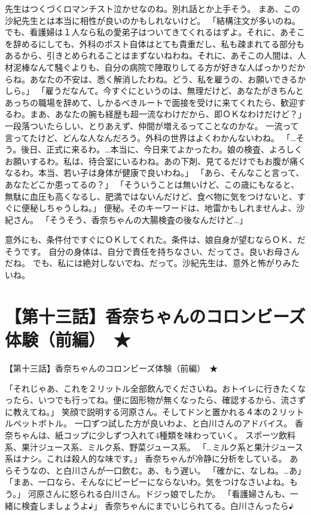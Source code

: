 先生はつくづくロマンチスト泣かせなのね。別れ話とか上手そう。
まあ、この沙紀先生とは本当に相性が良いのかもしれないけど。
「結構注文が多いのね。でも、看護婦は１人なら私の愛弟子はついてきてくれるはずよ。それに、あそこを辞めるにしても、外科のポスト自体はとても貴重だし、私も疎まれてる部分もあるから、引きとめられることはまずないねわね。それに、あそこの人間は、人材泥棒なんて騒ぐよりも、自分の病院で陣取りしてる方が好きな人ばっかりだからね。あなたの不安は、悉く解消したわね。どう、私を雇うの、お願いできるかしら。」
「雇うだなんて。今すぐにというのは、無理だけど、あなたがきちんとあっちの職場を辞めて、しかるべきルートで面接を受けに来てくれたら、歓迎するわ。まあ、あなたの腕も経歴も超一流なわけだから、即ＯＫなわけだけど？」
一段落ついたらしい、とりあえず、仲間が増えるってことなのかな。
一流って言ってたけど、どんな人なんだろう。外科の世界はよくわかんないわね。
「…そう。後日、正式に来るわ。…本当に、今日来てよかったわ。娘の検査、よろしくお願いするわ。私は、待合室にいるわね。あの下剤、見てるだけでもお腹が痛くなるわ。本当、若い子は身体が健康で良いわね。」
「あら、そんなこと言って、あなたどこか患ってるの？」
「そういうことは無いけど、この歳にもなると、無駄に血圧も高くなるし、肥満ではないんだけど、食べ物に気をつけないと、すぐに便秘しちゃうしね。」
便秘。そのキーワードは、地雷かもしれませんよ、沙紀さん。
「そうそう、香奈ちゃんの大腸検査の後なんだけど…」

意外にも、条件付ですぐにＯＫしてくれた。条件は、娘自身が望むならＯＫ、だそうです。
自分の身体は、自分で責任を持ちなさい、だってさ。良いお母さんだね。
でも、私には絶対しないでね、だって。沙紀先生は、意外と怖がりみたいね。



\section{【第十三話】香奈ちゃんのコロンビーズ体験（前編）　★}
【第十三話】香奈ちゃんのコロンビーズ体験（前編）　★


「それじゃあ、これを２リットル全部飲んでくださいね。おトイレに行きたくなったら、いつでも行ってね。便に固形物が無くなったら、確認するから、流さずに教えてね。」
笑顔で説明する河原さん。そしてドンと置かれる４本の２リットルペットボトル。
一口ずつ試した方が良いわよ、と白川さんのアドバイス。
香奈ちゃんは、紙コップに少しずつ入れて4種類を味わっていく。
スポーツ飲料系、果汁ジュース系、ミルク系、野菜ジュース系。
「…ミルク系と果汁ジュース系はナシ。これは殺人的な味です。」
香奈ちゃんが冷静に分析をしている。
あらそうなの、と白川さんが一口飲む。あ、もう遅い。
「確かに、なしね。…あ」
「まあ、一口なら、そんなにピーピーにならないわ。気をつけなさいよね。もう。」
河原さんに怒られる白川さん。ドジっ娘でしたか。
「看護婦さんも、一緒に検査しましょうよ♪」
香奈ちゃんにまでいじられてる。白川さんったら♪

